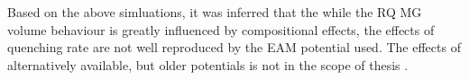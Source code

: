 Based on the above simluations, it was inferred that the while the RQ MG volume behaviour is greatly influenced by compositional effects,  the effects of quenching rate are not well reproduced by the EAM potential used. The effects of alternatively available, but older potentials is not in the scope of thesis \cite{Cheng2008,Mendelev2009}.
